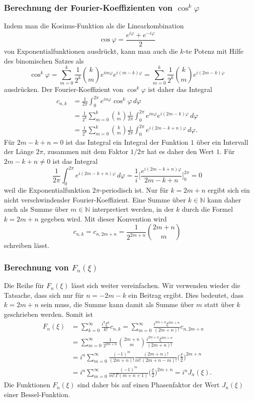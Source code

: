 \subsubsection{Berechnung der Fourier-Koeffizienten von $\cos^k\varphi$}
Indem man die Kosinus-Funktion als die Linearkombination
\[
\cos\varphi
=
\frac{e^{i\varphi}+e^{-i\varphi}}2
\]
von Exponentialfunktionen ausdrückt, kann man auch die $k$-te Potenz 
mit Hilfe des binomischen Satzes als
\[
\cos^k\varphi
=
\sum_{m=0}^k
\frac{1}{2^k}
\binom{k}{m}
e^{im\varphi}e^{i(m-k)\varphi}
=
\sum_{m=0}^k
\frac{1}{2^k}
\binom{k}{m}
e^{i(2m-k)\varphi}
\]
ausdrücken.
Der Fourier-Koeffizient von $\cos^k\varphi$ ist daher das Integral
\begin{align*}
c_{n,k}
&=
\frac{1}{2\pi}
\int_0^{2\pi}
e^{in\varphi}\cos^k\varphi\,d\varphi
\\
&=
\frac{1}{2^k}
\sum_{m=0}^k
\binom{k}{m}
\frac{1}{2\pi}
\int_0^{2\pi}
e^{in\varphi}e^{i(2m-k)\varphi}
\,d\varphi
\\
&=
\frac{1}{2^k}
\sum_{m=0}^k
\binom{k}{m}
\frac{1}{2\pi}
\int_0^{2\pi}
e^{i(2m-k+n)\varphi}
\,d\varphi.
\end{align*}
Für $2m-k+n=0$ ist das Integral ein Integral der Funktion $1$ über
ein Intervall der Länge $2\pi$, zusammen mit dem Faktor $1/2\pi$ hat
es daher den Wert $1$.
Für $2m-k+n\ne 0$ ist das Integral 
\[
\frac{1}{2\pi}
\int_0^{2\pi}
e^{i(2m-k+n)\varphi}
\,d\varphi
=
\frac{1}{i}
\biggl[
\frac{e^{i(2m-k+n)\varphi}}{2m-k+n}
\biggr]_0^{2\pi}
=
0
\]
weil die Exponentialfunktion $2\pi$-periodisch ist.
Nur für $k=2m+n$ ergibt sich ein nicht verschwindender
Fourier-Koeffizient.
Eine Summe über $k\in\mathbb{N}$ kann daher auch als Summe über
$m\in\mathbb{N}$ interpretiert werden, in der $k$ durch die Formel
$k=2m+n$ gegeben wird.
Mit dieser Konvention wird
\[
c_{n,k}
=
c_{n,2m+n}
=
\frac{1}{2^{2m+n}}
\binom{2m+n}{m}
\]
schreiben lässt.

\subsubsection{Berechnung von $F_n(\xi)$}
Die Reihe für $F_n(\xi)$ lässt sich weiter vereinfachen.
Wir verwenden wieder die Tatsache, dass sich nur für $n=-2m-k$
ein Beitrag ergibt.
Dies bedeutet, dass $k=2m+n$ sein muss, die Summe kann damit als
Summe über $m$ statt über $k$ geschrieben werden.
Somit ist
\begin{align*}
F_n(\xi)
&=
\sum_{k=0}^\infty
\frac{i^k\xi^k}{k!}
c_{n,k}
=
\sum_{m=0}^\infty
\frac{i^{2m+n}\xi^{2m+n}}{(2m+n)!}
c_{n,2m+n}
\\
&=
\sum_{m=0}^\infty
\frac{1}{2^{2m+n}}
\binom{2m+n}{m}
\frac{i^{2m+n}\xi^{2m+n}}{(2m+n)!}
\\
&=
i^n
\sum_{m=0}^\infty
\frac{(-1)^m}{(2m+n)!}
\frac{(2m+n)!}{m!\,(2m+n-m)!}
\biggl(\frac{\xi}{2}\biggr)^{2m+n}
\\
&=
i^n
\sum_{m=0}^\infty
\frac{(-1)^m}
{m!\,\Gamma(m+n+1)}
\biggl(\frac{\xi}{2}\biggr)^{2m+n}
=
i^n J_n(\xi).
\end{align*}
Die Funktionen $F_n(\xi)$ sind daher bis auf einen Phasenfaktor der
Wert $J_n(\xi)$ einer Bessel-Funktion.

